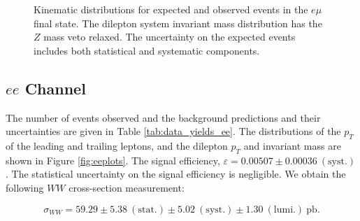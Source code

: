 \begin{figure}[!hbtp]
\begin{center}
\caption{Kinematic distributions for expected and observed events in the $e\mu$ final state.
The dilepton system invariant mass distribution has the $Z$ mass veto relaxed.
The uncertainty on the expected events includes both statistical and systematic components.}
\label{fig:emplots}
\end{center}
\end{figure}

%
%
%
\clearpage
\subsection{$ee$ Channel}

The number of events observed and the background predictions and their uncertainties are
given in Table \ref{tab:data_yields_ee}.
The distributions of the $p_{T}$ of the leading and trailing leptons, and the dilepton $p_{T}$
and invariant mass are shown in Figure \ref{fig:eeplots}.
The signal efficiency,  $\varepsilon = 0.00507 \pm 0.00036~\mathrm{(syst.)}$.
The statistical uncertainty on the signal efficiency is negligible.
We obtain the following $WW$ cross-section measurement:

\begin{equation*}
\sigma_{WW}  = 59.29 \pm 5.38~\mathrm{(stat.)} \pm 5.02~\mathrm{(syst.)} \pm 1.30~\mathrm{(lumi.)~pb}.
\end{equation*}

